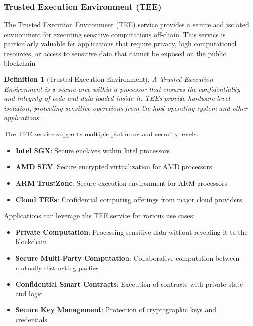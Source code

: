 \documentclass{article}
\newtheorem{definition}{Definition}
\begin{document}
\subsubsection{Trusted Execution Environment (TEE)}
\label{subsubsec:tee}

The Trusted Execution Environment (TEE) service provides a secure and isolated environment for executing sensitive computations off-chain. This service is particularly valuable for applications that require privacy, high computational resources, or access to sensitive data that cannot be exposed on the public blockchain.



\begin{definition}[Trusted Execution Environment]
A Trusted Execution Environment is a secure area within a processor that ensures the confidentiality and integrity of code and data loaded inside it. TEEs provide hardware-level isolation, protecting sensitive operations from the host operating system and other applications.
\end{definition}

The TEE service supports multiple platforms and security levels:

\begin{itemize}
    \item \textbf{Intel SGX}: Secure enclaves within Intel processors
    \item \textbf{AMD SEV}: Secure encrypted virtualization for AMD processors
    \item \textbf{ARM TrustZone}: Secure execution environment for ARM processors
    \item \textbf{Cloud TEEs}: Confidential computing offerings from major cloud providers
\end{itemize}

Applications can leverage the TEE service for various use cases:

\begin{itemize}
    \item \textbf{Private Computation}: Processing sensitive data without revealing it to the blockchain
    \item \textbf{Secure Multi-Party Computation}: Collaborative computation between mutually distrusting parties
    \item \textbf{Confidential Smart Contracts}: Execution of contracts with private state and logic
    \item \textbf{Secure Key Management}: Protection of cryptographic keys and credentials
\end{itemize}
\end{document}
